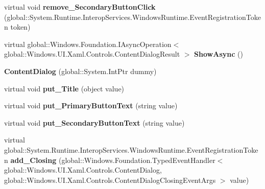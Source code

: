 \begin{DoxyCompactItemize}
\item 
\mbox{\label{class_windows_1_1_u_i_1_1_xaml_1_1_controls_1_1_content_dialog_a3dfa1680cb30bf0dc1f3402bc879912e}} 
virtual void {\bfseries remove\+\_\+\+Secondary\+Button\+Click} (global\+::\+System.\+Runtime.\+Interop\+Services.\+Windows\+Runtime.\+Event\+Registration\+Token token)
\item 
\mbox{\label{class_windows_1_1_u_i_1_1_xaml_1_1_controls_1_1_content_dialog_acc6835ff256e59954bab47b9ce049071}} 
virtual global\+::\+Windows.\+Foundation.\+I\+Async\+Operation$<$ global\+::\+Windows.\+U\+I.\+Xaml.\+Controls.\+Content\+Dialog\+Result $>$ {\bfseries Show\+Async} ()
\item 
\mbox{\label{class_windows_1_1_u_i_1_1_xaml_1_1_controls_1_1_content_dialog_ac5cd215d832532c7377d5d28dc7c9e2f}} 
{\bfseries Content\+Dialog} (global\+::\+System.\+Int\+Ptr dummy)
\item 
\mbox{\label{class_windows_1_1_u_i_1_1_xaml_1_1_controls_1_1_content_dialog_a0a34b740496886293e402395da09194f}} 
virtual void {\bfseries put\+\_\+\+Title} (object value)
\item 
\mbox{\label{class_windows_1_1_u_i_1_1_xaml_1_1_controls_1_1_content_dialog_adcf99702d4b190842bce4c72ae4f8e60}} 
virtual void {\bfseries put\+\_\+\+Primary\+Button\+Text} (string value)
\item 
\mbox{\label{class_windows_1_1_u_i_1_1_xaml_1_1_controls_1_1_content_dialog_a0c1be8e4e5f2ada768536bad2d8ca78b}} 
virtual void {\bfseries put\+\_\+\+Secondary\+Button\+Text} (string value)
\item 
\mbox{\label{class_windows_1_1_u_i_1_1_xaml_1_1_controls_1_1_content_dialog_a112044e25750429e881c4e8edede4a3b}} 
virtual global\+::\+System.\+Runtime.\+Interop\+Services.\+Windows\+Runtime.\+Event\+Registration\+Token {\bfseries add\+\_\+\+Closing} (global\+::\+Windows.\+Foundation.\+Typed\+Event\+Handler$<$ global\+::\+Windows.\+U\+I.\+Xaml.\+Controls.\+Content\+Dialog, global\+::\+Windows.\+U\+I.\+Xaml.\+Controls.\+Content\+Dialog\+Closing\+Event\+Args $>$ value)

\end{DoxyCompactItemize}
